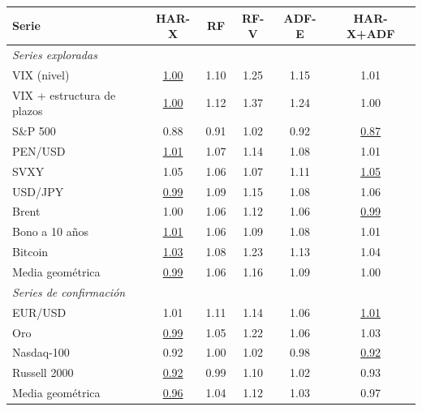\begin{tabularx}{\textwidth}{X *{5}{c}}
\toprule
Serie & HAR-X & RF & RF-V & ADF-E & HAR-X+ADF \\
\midrule
\multicolumn{6}{l}{\textit{Series exploradas}} \\
VIX (nivel) & \underline{1.00} & 1.10 & 1.25 & 1.15 & 1.01 \\
VIX + estructura de plazos & \underline{1.00} & 1.12 & 1.37 & 1.24 & 1.00 \\
S\&P 500 & 0.88 & 0.91 & 1.02 & 0.92 & \underline{0.87} \\
PEN/USD & \underline{1.01} & 1.07 & 1.14 & 1.08 & 1.01 \\
SVXY & 1.05 & 1.06 & 1.07 & 1.11 & \underline{1.05} \\
USD/JPY & \underline{0.99} & 1.09 & 1.15 & 1.08 & 1.06 \\
Brent & 1.00 & 1.06 & 1.12 & 1.06 & \underline{0.99} \\
Bono a 10 años & \underline{1.01} & 1.06 & 1.09 & 1.08 & 1.01 \\
Bitcoin & \underline{1.03} & 1.08 & 1.23 & 1.13 & 1.04 \\
Media geométrica & \underline{0.99} & 1.06 & 1.16 & 1.09 & 1.00 \\
\midrule
\multicolumn{6}{l}{\textit{Series de confirmación}} \\
EUR/USD & 1.01 & 1.11 & 1.14 & 1.06 & \underline{1.01} \\
Oro & \underline{0.99} & 1.05 & 1.22 & 1.06 & 1.03 \\
Nasdaq-100 & 0.92 & 1.00 & 1.02 & 0.98 & \underline{0.92} \\
Russell 2000 & \underline{0.92} & 0.99 & 1.10 & 1.02 & 0.93 \\
Media geométrica & \underline{0.96} & 1.04 & 1.12 & 1.03 & 0.97 \\
\bottomrule
\end{tabularx}
